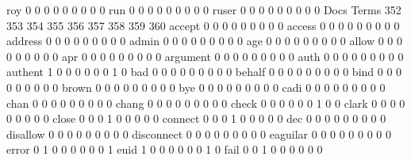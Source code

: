 \documentclass[compress,8pt]{beamer}
\begin{document}
\begin{frame}
\begin{Schunk}
  roy                                        0   0   0   0   0   0   0   0   0
  run                                        0   0   0   0   0   0   0   0   0
  ruser                                      0   0   0   0   0   0   0   0   0
                                          Docs
Terms                                      352 353 354 355 356 357 358 359 360
  accept                                     0   0   0   0   0   0   0   0   0
  access                                     0   0   0   0   0   0   0   0   0
  address                                    0   0   0   0   0   0   0   0   0
  admin                                      0   0   0   0   0   0   0   0   0
  age                                        0   0   0   0   0   0   0   0   0
  allow                                      0   0   0   0   0   0   0   0   0
  apr                                        0   0   0   0   0   0   0   0   0
  argument                                   0   0   0   0   0   0   0   0   0
  auth                                       0   0   0   0   0   0   0   0   0
  authent                                    1   0   0   0   0   0   0   1   0
  bad                                        0   0   0   0   0   0   0   0   0
  behalf                                     0   0   0   0   0   0   0   0   0
  bind                                       0   0   0   0   0   0   0   0   0
  brown                                      0   0   0   0   0   0   0   0   0
  bye                                        0   0   0   0   0   0   0   0   0
  cadi                                       0   0   0   0   0   0   0   0   0
  chan                                       0   0   0   0   0   0   0   0   0
  chang                                      0   0   0   0   0   0   0   0   0
  check                                      0   0   0   0   0   0   1   0   0
  clark                                      0   0   0   0   0   0   0   0   0
  close                                      0   0   0   1   0   0   0   0   0
  connect                                    0   0   0   1   0   0   0   0   0
  dec                                        0   0   0   0   0   0   0   0   0
  disallow                                   0   0   0   0   0   0   0   0   0
  disconnect                                 0   0   0   0   0   0   0   0   0
  eaguilar                                   0   0   0   0   0   0   0   0   0
  error                                      0   1   0   0   0   0   0   0   1
  euid                                       1   0   0   0   0   0   0   1   0
  fail                                       0   0   1   0   0   0   0   0   0

\end{Schunk}
\end{frame}
\end{document}

